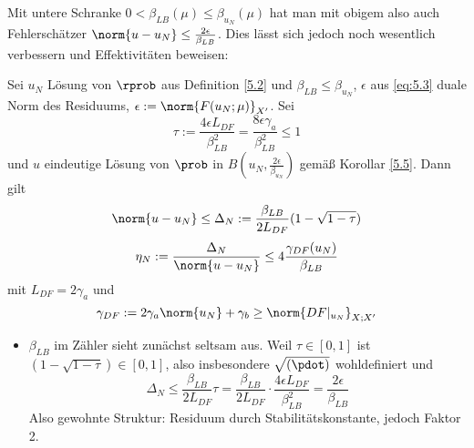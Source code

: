 \begin{bem}
	Mit untere Schranke $0 < \beta_{LB}(\mu) \leq \beta_{u_N}(\mu)$ hat man mit obigem also auch Fehlerschätzer $\norm{u-u_N} \leq \frac{2\epsilon}{\beta_{LB}}$.
	Dies lässt sich jedoch noch wesentlich verbessern und Effektivitäten beweisen:
\end{bem}

\begin{satz} \label{5.6}
	Sei $u_N$ Lösung von $\rprob$ aus Definition \ref{5.2} und $\beta_{LB} \leq \beta_{u_N}$, $\epsilon$ aus \eqref{eq:5.3} duale Norm des Residuums, $\epsilon := \norm{F(u_N;\mu)}_{X'}$.
	Sei
	\[
		\tau := \frac{4\epsilon L_{DF}}{\beta_{LB}^2} = \frac{8 \epsilon\gamma_a}{\beta_{LB}^2} \leq 1
	\]
	und $u$ eindeutige Lösung von $\prob$ in $B(u_N,\frac{2\epsilon}{\beta_{u_N}})$ gemäß Korollar \ref{5.5}. Dann gilt
	\[
		\norm{u-u_N} \leq \Delta_N := \frac{\beta_{LB}}{2 L_{DF}} (1-\sqrt{1-\tau})
	\]
	\[
		\eta_N := \frac{\Delta_N}{\norm{u-u_N}} \leq 4 \frac{\gamma_{DF}(u_N)}{\beta_{LB}}
	\]
	mit $L_{DF} = 2\gamma_a$ und
	\[
		\gamma_{DF} := 2\gamma_a \norm{u_N}+\gamma_b \geq \norm{DF|_{u_N}}_{X;X'}
	\]
\end{satz}

\begin{bem} \beginwithlistbem
	\begin{itemize}
		\item $\beta_{LB}$ im Zähler sieht zunächst seltsam aus. Weil $\tau \in [0,1]$ ist $(1-\sqrt{1-\tau}) \in [0,1]$, also insbesondere $\sqrt{(\pdot)}$ wohldefiniert und
			\begin{equation} \label{eq:5.4}
				\Delta_N \leq \frac{\beta_{LB}}{2 L_{DF}} \tau = \frac{\beta_{LB}}{2 L_{DF}} \cdot \frac{4 \epsilon L_{DF}}{\beta_{LB}^2} = \frac{2 \epsilon}{\beta_{LB}}
			\end{equation}
			Also gewohnte Struktur: Residuum durch Stabilitätskonstante, jedoch Faktor 2.
	\end{itemize}
\end{bem}

